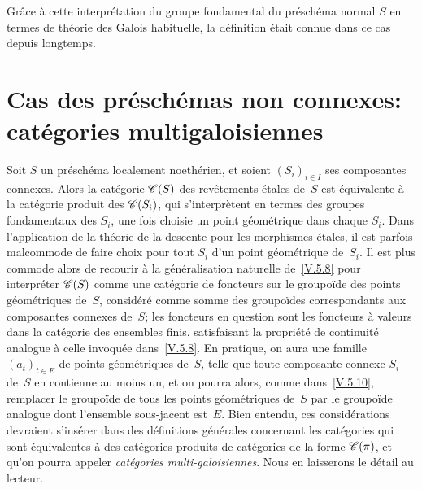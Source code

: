 \begin{remarquestar}
Gr\^ace \`a cette interpr\'etation du groupe fondamental du
pr\'esch\'ema normal $S$ en termes de th\'eorie des Galois
habituelle, la d\'efinition \'etait connue dans ce cas depuis
longtemps.
\end{remarquestar}

\section{Cas des pr\'esch\'emas non connexes: cat\'egories
multigaloisiennes}
\label{V.9}

Soit $S$ un pr\'esch\'ema localement noeth\'erien, et soient
$(S_i)_{i\in I}$ ses composantes connexes. Alors la cat\'egorie
$\cal{C}(S)$ des rev\^etements \'etales de~$S$ est \'equivalente
\`a la cat\'egorie produit des $\cal{C}(S_i)$, qui
s'interpr\`etent en termes des groupes fondamentaux des $S_i$, une
fois choisie un point g\'eom\'etrique dans chaque $S_i$. Dans
l'application de la th\'eorie de la descente pour les morphismes
\'etales, il est parfois malcommode de faire choix pour tout $S_i$
d'un point g\'eom\'etrique de~$S_i$. Il est plus commode alors
de recourir \`a la g\'en\'eralisation naturelle de~\ref{V.5.8}
pour interpr\'eter $\cal{C}(S)$ comme une cat\'egorie de foncteurs
sur le groupo\"ide des points g\'eom\'etriques de~$S$,
consid\'er\'e comme somme des groupo\"ides correspondants aux
composantes connexes de~$S$; les foncteurs en question sont les
foncteurs \`a valeurs dans la cat\'egorie des ensembles finis,
satisfaisant la propri\'et\'e de continuit\'e analogue \`a
celle invoqu\'ee dans~\ref{V.5.8}. En pratique, on aura une famille
$(a_t)_{t\in E}$ de points g\'eom\'etriques de~$S$, telle que
toute composante connexe $S_i$ de~$S$ en contienne au moins un, et on
pourra alors, comme dans~\ref{V.5.10}, remplacer le groupo\"ide de
tous les points g\'eom\'etriques de~$S$ par le groupo\"ide
analogue dont l'ensemble sous-jacent est~$E$. Bien entendu, ces
consid\'erations devraient s'ins\'erer dans des d\'efinitions
g\'en\'erales concernant les cat\'egories qui sont
\'equivalentes \`a des cat\'egories produits de cat\'egories
de la forme $\cal{C}(\pi)$, et qu'on pourra appeler
\emph{catégories multi-galoisiennes}.
Nous en laisserons le d\'etail au lecteur.

